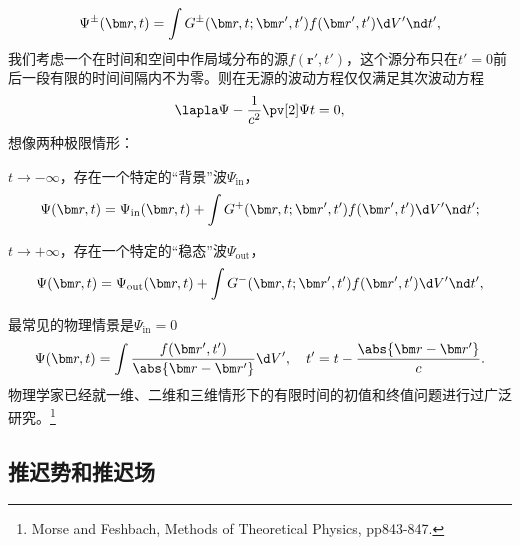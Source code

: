 \[
    \Psi^\pm(\bm r,t)=\int G^\pm(\bm r,t;\bm r',t')f(\bm r',t')\d V'\nd t',
\]
我们考虑一个在时间和空间中作局域分布的源$f(\bm r',t')$，这个源分布只在$t'=0$前后一段有限的时间间隔内不为零。则在无源的波动方程仅仅满足其次波动方程
\[
    \lapla\Psi-\frac1{c^2}\pv[2]\Psi t=0,
\]
想像两种极限情形：
\begin{compactenum}
	\item $t\to-\infty$，存在一个特定的“背景”波$\Psi_\text{in}$，
	\[
        \Psi(\bm r,t)=\Psi_\text{in}(\bm r,t)+\int G^+(\bm r,t;\bm r',t')f(\bm r',t')\d V'\nd t';
    \]
	\item $t\to+\infty$，存在一个特定的“稳态”波$\Psi_\text{out}$，
	\[
        \Psi(\bm r,t)=\Psi_\text{out}(\bm r,t)+\int G^-(\bm r,t;\bm r',t')f(\bm r',t')\d V'\nd t',
    \]
\end{compactenum}
最常见的物理情景是$\Psi_\text{in}=0$%
\begin{equation}
    \Psi(\bm r,t)=\int\frac{f(\bm r',t')}{\abs{\bm r-\bm r'}}\d V',\quad t'=t-\frac{\abs{\bm r-\bm r'}}c.
\end{equation}
物理学家已经就一维、二维和三维情形下的有限时间的初值和终值问题进行过广泛研究。\footnote{Morse and Feshbach, Methods of Theoretical Physics, pp843-847.}

\subsection{推迟势和推迟场}

\newcommand{\ret}{\mathrm{ret}}

